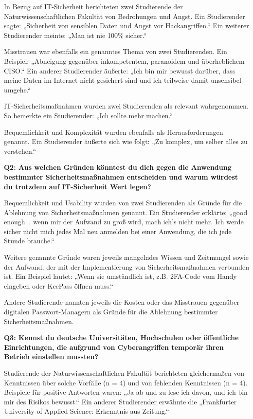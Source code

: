 \documentclass[german,report]{i1thesis}
\begin{document}
In Bezug auf IT-Sicherheit berichteten zwei Studierende der Naturwissenschaftlichen Fakultät von Bedrohungen und Angst. Ein Studierender sagte: „Sicherheit von sensiblen Daten und Angst vor Hackangriffen.“ Ein weiterer Studierender meinte: „Man ist nie 100\% sicher.“

Misstrauen war ebenfalls ein genanntes Thema von zwei Studierenden. Ein Beispiel: „Abneigung gegenüber inkompetentem, paranoidem und überheblichem CISO.“ Ein anderer Studierender äußerte: „Ich bin mir bewusst darüber, dass meine Daten im Internet nicht gesichert sind und ich teilweise damit unsensibel umgehe.“

IT-Sicherheitsmaßnahmen wurden zwei Studierenden als relevant wahrgenommen. So bemerkte ein Studierender: „Ich sollte mehr machen.“

Bequemlichkeit und Komplexität wurden ebenfalls als Herausforderungen genannt. Ein Studierender äußerte sich wie folgt: „Zu komplex, um selber alles zu verstehen.“

\textbf{Q2: Aus welchen Gründen könntest du dich gegen die Anwendung bestimmter Sicherheitsmaßnahmen entscheiden und warum würdest du trotzdem auf IT-Sicherheit Wert legen?}

Bequemlichkeit und Usability wurden von zwei Studierenden als Gründe für die Ablehnung von Sicherheitsmaßnahmen genannt. Ein Studierender erklärte: „good enough... wenn mir der Aufwand zu groß wird, mach ich's nicht mehr. Ich werde sicher nicht mich jedes Mal neu anmelden bei einer Anwendung, die ich jede Stunde brauche.“

Weitere genannte Gründe waren jeweils mangelndes Wissen und Zeitmangel sowie der Aufwand, der mit der Implementierung von Sicherheitsmaßnahmen verbunden ist. Ein Beispiel lautet: „Wenn sie umständlich ist, z.B. 2FA-Code vom Handy eingeben oder KeePass öffnen muss.“

Andere Studierende nannten jeweils die Kosten oder das Misstrauen gegenüber digitalen Passwort-Managern als Gründe für die Ablehnung bestimmter Sicherheitsmaßnahmen.

\textbf{Q3: Kennst du deutsche Universitäten, Hochschulen oder öffentliche Einrichtungen, die aufgrund von Cyberangriffen temporär ihren Betrieb einstellen mussten?}

Studierende der Naturwissenschaftlichen Fakultät berichteten gleichermaßen von Kenntnissen über solche Vorfälle (n = 4) und von fehlenden Kenntnissen (n = 4). Beispiele für positive Antworten waren: „Ja ab und zu lese ich davon, und ich bin mir des Risikos bewusst.“ Ein anderer Studierender erwähnte die „Frankfurter University of Applied Science: Erkenntnis aus Zeitung.“
\end{document}
